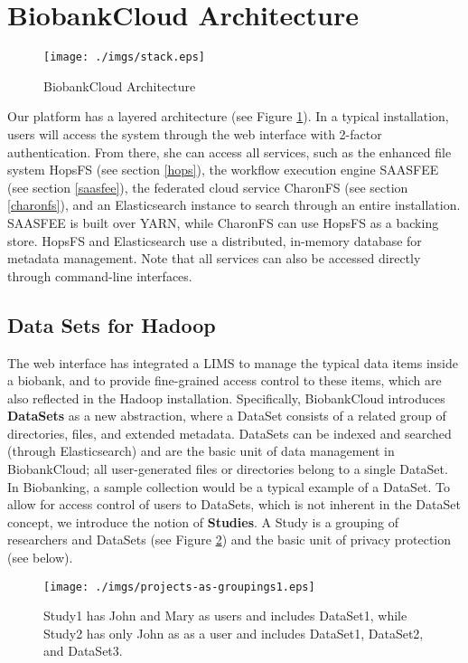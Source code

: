 \section{BiobankCloud Architecture}

 \begin{figure}[h]
 \centering
 \texttt{[image: ./imgs/stack.eps]}
 \caption{BiobankCloud Architecture}
 \label{fig:arch}
\end{figure}

Our platform has a layered architecture (see Figure \ref{fig:arch}). In a typical installation, users will access the system through the web interface with 2-factor authentication. From there, she can access all services, such as the enhanced file system HopsFS (see section \ref{hops}), the workflow execution engine SAASFEE (see section \ref{saasfee}), the federated cloud service CharonFS (see section \ref{charonfs}), and an Elasticsearch instance to search through an entire installation. SAASFEE is built over YARN, while CharonFS can use HopsFS as a backing store. HopsFS and  Elasticsearch use a distributed, in-memory database for metadata management. Note that all services can also be accessed directly through command-line interfaces.

\subsection*{Data Sets for Hadoop}

The web interface has integrated a LIMS to manage the typical data items inside a biobank, and to provide fine-grained access control to these items, which are also reflected in the Hadoop installation. Specifically, 
BiobankCloud introduces \textbf{DataSets} as a new abstraction, where a DataSet consists of a related group of directories, files, and extended metadata. DataSets can be indexed and searched (through Elasticsearch) and are the basic unit of data management in BiobankCloud; all user-generated files or directories belong to a single DataSet. In Biobanking, a sample collection would be a typical example of a DataSet.  To allow for access control of users to DataSets, which is not inherent in the DataSet concept, we introduce the notion of \textbf{Studies}. A Study is a grouping of researchers and DataSets (see Figure \ref{fig:studies}) and the basic unit of privacy protection (see below). 

\begin{figure}[h]
 \centering
 \texttt{[image: ./imgs/projects-as-groupings1.eps]}
\caption{Study1 has John and Mary as users and includes DataSet1, while Study2 has only John as as a user and includes DataSet1, DataSet2, and DataSet3.}
\label{fig:studies}
\end{figure}

